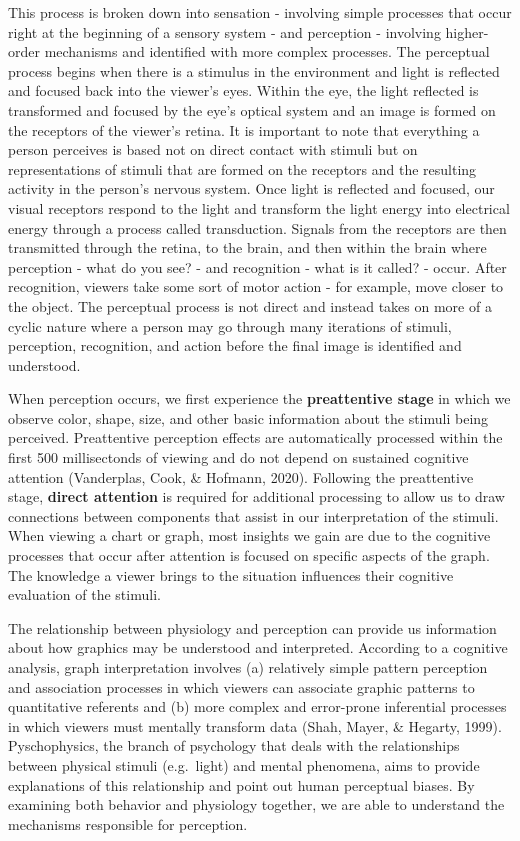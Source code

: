 \documentclass[print]{nuthesis}
\begin{document}
This process is broken down into sensation - involving simple processes that occur right at the beginning of a sensory system - and perception - involving higher-order mechanisms and identified with more complex processes.
The perceptual process begins when there is a stimulus in the environment and light is reflected and focused back into the viewer's eyes.
Within the eye, the light reflected is transformed and focused by the eye's optical system and an image is formed on the receptors of the viewer's retina.
It is important to note that everything a person perceives is based not on direct contact with stimuli but on representations of stimuli that are formed on the receptors and the resulting activity in the person's nervous system.
Once light is reflected and focused, our visual receptors respond to the light and transform the light energy into electrical energy through a process called transduction.
Signals from the receptors are then transmitted through the retina, to the brain, and then within the brain where perception - what do you see? - and recognition - what is it called? - occur.
After recognition, viewers take some sort of motor action - for example, move closer to the object.
The perceptual process is not direct and instead takes on more of a cyclic nature where a person may go through many iterations of stimuli, perception, recognition, and action before the final image is identified and understood.

When perception occurs, we first experience the \textbf{preattentive stage} in which we observe color, shape, size, and other basic information about the stimuli being perceived. Preattentive perception effects are automatically processed within the first 500 millisectonds of viewing and do not depend on sustained cognitive attention (Vanderplas, Cook, \& Hofmann, 2020).
Following the preattentive stage, \textbf{direct attention} is required for additional processing to allow us to draw connections between components that assist in our interpretation of the stimuli.
When viewing a chart or graph, most insights we gain are due to the cognitive processes that occur after attention is focused on specific aspects of the graph.
The knowledge a viewer brings to the situation influences their cognitive evaluation of the stimuli.  

The relationship between physiology and perception can provide us information about how graphics may be understood and interpreted. 
According to a cognitive analysis, graph interpretation involves (a) relatively simple pattern perception and association processes in which viewers can associate graphic patterns to quantitative referents and (b) more complex and error-prone inferential processes in which viewers must mentally transform data (Shah, Mayer, \& Hegarty, 1999).
Pyschophysics, the branch of psychology that deals with the relationships between physical stimuli (e.g.~light) and mental phenomena, aims to provide explanations of this relationship and point out human perceptual biases.
By examining both behavior and physiology together, we are able to understand the mechanisms responsible for perception.
\end{document}
